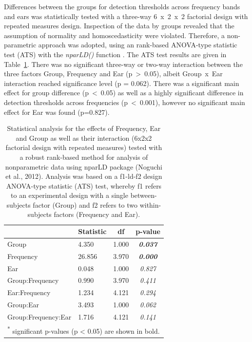 \documentclass[a4paper, twoside]{templates/ociamthesis}
\begin{document}
Differences between the groups for detection thresholds across frequency bands and ears was statistically tested with a three-way 6~x~2~x~2 factorial design with repeated measures design. Inspection of the data by groups revealed that the assumption of normality and homoscedasticity were violated. Therefore, a non-parametric approach was adopted, using an rank-based ANOVA-type statistic test (ATS) with the \emph{nparLD()} function \autocite[nparLD package ;][]{nparLDPackageR}. The ATS test results are given in Table~\ref{tab:RegAud-TabnparLD}. There was no significant three-way or two-way interaction between the three factors Group, Frequency and Ear (p~\textgreater~0.05), albeit Group~x~Ear interaction reached significance level (p = 0.062). There was a significant main effect for group difference (p~\textless~0.05) as well as a highly significant difference in detection thresholds across frequencies (p~\textless~0.001), however no significant main effect for Ear was found (p=0.827).

\begin{table}

\caption{\label{tab:RegAud-TabnparLD}Statistical analysis for the effects of Frequency, Ear and Group as well as their interaction (6x2x2 factorial design with repeated measures) tested with a robust rank-based method for analysis of nonparametric data using nparLD package (Noguchi et al., 2012). Analysis was based on a f1-ld-f2 design ANOVA-type statistic (ATS) test, whereby f1 refers to an experimental design with a single between-subjects factor (Group) and f2 refers to two within-subjects factors (Frequency and Ear).}
\centering
\begin{tabular}[t]{llc>{}c}
\toprule
  & Statistic & df & p-value\\
\midrule
Group & 4.350 & 1.000 & \em{\textbf{0.037}}\\
Frequency & 26.856 & 3.970 & \em{\textbf{0.000}}\\
Ear & 0.048 & 1.000 & \em{0.827}\\
Group:Frequency & 0.990 & 3.970 & \em{0.411}\\
Ear:Frequency & 1.234 & 4.121 & \em{0.294}\\
Group:Ear & 3.493 & 1.000 & \em{0.062}\\
Group:Frequency:Ear & 1.716 & 4.121 & \em{0.141}\\
\bottomrule
\multicolumn{4}{l}{\textsuperscript{*} significant p-values (p < 0.05) are shown in bold.}\\
\end{tabular}
\end{table}
\end{document}
